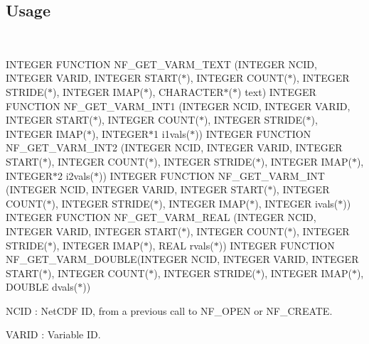 \subsection*{Usage }

 

I\+N\+T\+E\+G\+ER F\+U\+N\+C\+T\+I\+ON N\+F\+\_\+\+G\+E\+T\+\_\+\+V\+A\+R\+M\+\_\+\+T\+E\+XT (I\+N\+T\+E\+G\+ER N\+C\+ID, I\+N\+T\+E\+G\+ER V\+A\+R\+ID, I\+N\+T\+E\+G\+ER S\+T\+A\+R\+T($\ast$), I\+N\+T\+E\+G\+ER C\+O\+U\+N\+T($\ast$), I\+N\+T\+E\+G\+ER S\+T\+R\+I\+D\+E($\ast$), I\+N\+T\+E\+G\+ER I\+M\+A\+P($\ast$), C\+H\+A\+R\+A\+C\+T\+E\+R$\ast$($\ast$) text) I\+N\+T\+E\+G\+ER F\+U\+N\+C\+T\+I\+ON N\+F\+\_\+\+G\+E\+T\+\_\+\+V\+A\+R\+M\+\_\+\+I\+N\+T1 (I\+N\+T\+E\+G\+ER N\+C\+ID, I\+N\+T\+E\+G\+ER V\+A\+R\+ID, I\+N\+T\+E\+G\+ER S\+T\+A\+R\+T($\ast$), I\+N\+T\+E\+G\+ER C\+O\+U\+N\+T($\ast$), I\+N\+T\+E\+G\+ER S\+T\+R\+I\+D\+E($\ast$), I\+N\+T\+E\+G\+ER I\+M\+A\+P($\ast$), I\+N\+T\+E\+G\+E\+R$\ast$1 i1vals($\ast$)) I\+N\+T\+E\+G\+ER F\+U\+N\+C\+T\+I\+ON N\+F\+\_\+\+G\+E\+T\+\_\+\+V\+A\+R\+M\+\_\+\+I\+N\+T2 (I\+N\+T\+E\+G\+ER N\+C\+ID, I\+N\+T\+E\+G\+ER V\+A\+R\+ID, I\+N\+T\+E\+G\+ER S\+T\+A\+R\+T($\ast$), I\+N\+T\+E\+G\+ER C\+O\+U\+N\+T($\ast$), I\+N\+T\+E\+G\+ER S\+T\+R\+I\+D\+E($\ast$), I\+N\+T\+E\+G\+ER I\+M\+A\+P($\ast$), I\+N\+T\+E\+G\+E\+R$\ast$2 i2vals($\ast$)) I\+N\+T\+E\+G\+ER F\+U\+N\+C\+T\+I\+ON N\+F\+\_\+\+G\+E\+T\+\_\+\+V\+A\+R\+M\+\_\+\+I\+NT (I\+N\+T\+E\+G\+ER N\+C\+ID, I\+N\+T\+E\+G\+ER V\+A\+R\+ID, I\+N\+T\+E\+G\+ER S\+T\+A\+R\+T($\ast$), I\+N\+T\+E\+G\+ER C\+O\+U\+N\+T($\ast$), I\+N\+T\+E\+G\+ER S\+T\+R\+I\+D\+E($\ast$), I\+N\+T\+E\+G\+ER I\+M\+A\+P($\ast$), I\+N\+T\+E\+G\+ER ivals($\ast$)) I\+N\+T\+E\+G\+ER F\+U\+N\+C\+T\+I\+ON N\+F\+\_\+\+G\+E\+T\+\_\+\+V\+A\+R\+M\+\_\+\+R\+E\+AL (I\+N\+T\+E\+G\+ER N\+C\+ID, I\+N\+T\+E\+G\+ER V\+A\+R\+ID, I\+N\+T\+E\+G\+ER S\+T\+A\+R\+T($\ast$), I\+N\+T\+E\+G\+ER C\+O\+U\+N\+T($\ast$), I\+N\+T\+E\+G\+ER S\+T\+R\+I\+D\+E($\ast$), I\+N\+T\+E\+G\+ER I\+M\+A\+P($\ast$), R\+E\+AL rvals($\ast$)) I\+N\+T\+E\+G\+ER F\+U\+N\+C\+T\+I\+ON N\+F\+\_\+\+G\+E\+T\+\_\+\+V\+A\+R\+M\+\_\+\+D\+O\+U\+B\+LE(I\+N\+T\+E\+G\+ER N\+C\+ID, I\+N\+T\+E\+G\+ER V\+A\+R\+ID, I\+N\+T\+E\+G\+ER S\+T\+A\+R\+T($\ast$), I\+N\+T\+E\+G\+ER C\+O\+U\+N\+T($\ast$), I\+N\+T\+E\+G\+ER S\+T\+R\+I\+D\+E($\ast$), I\+N\+T\+E\+G\+ER I\+M\+A\+P($\ast$), D\+O\+U\+B\+LE dvals($\ast$))

{\ttfamily N\+C\+ID} \+: Net\+C\+DF ID, from a previous call to N\+F\+\_\+\+O\+P\+EN or N\+F\+\_\+\+C\+R\+E\+A\+TE.

{\ttfamily V\+A\+R\+ID} \+: Variable ID.

